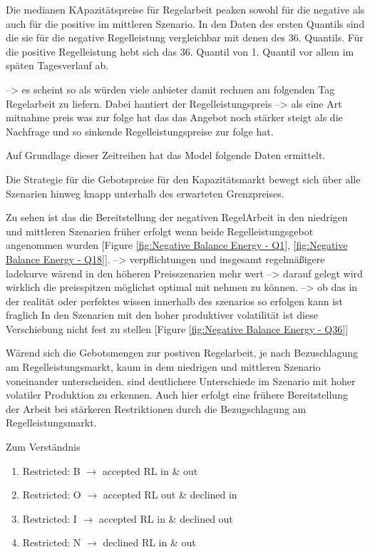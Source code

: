 Die medianen  KApazitätspreise für Regelarbeit peaken
sowohl für die negative als auch für die positive im mittleren Szenario. In den Daten des ersten Quantils sind die sie für die negative Regelleistung
vergleichbar mit denen des 36. Quantils. Für die positive Regelleistung hebt sich das 36. Quantil von 1. Quantil vor allem im späten Tagesverlauf ab.

--> es scheint so als würden viele anbieter damit rechnen am folgenden Tag Regelarbeit zu liefern. Dabei hantiert der Regelleistungspreis
--> als eine Art mitnahme preis was zur folge hat das das Angebot noch stärker steigt als die Nachfrage und so sinkende Regelleistungspreise zur folge hat.

Auf Grundlage dieser Zeitreihen hat das Model folgende Daten ermittelt.

Die Strategie für die Gebotspreise für den Kapazitätsmarkt bewegt sich über alle Szenarien hinweg knapp unterhalb des erwarteten Grenzpreises.

Zu sehen ist das die Bereitstellung der negativen RegelArbeit
in den niedrigen und mittleren Szenarien früher erfolgt wenn beide Regelleistungsgebot angenommen wurden [Figure \ref{fig:Negative Balance Energy - Q1}, \ref{fig:Negative Balance Energy - Q18}].
--> verpflichtungen und insgesamt regelmäßigere ladekurve wärend in den höheren Preisszenarien mehr wert
--> darauf gelegt wird wirklich die preisspitzen möglichst optimal mit nehmen zu können.
--> ob das in der realität oder perfektes wissen innerhalb des szenarios so erfolgen kann ist fraglich
In den Szenarien mit den hoher produktiver volatilität ist diese Verschiebung nicht fest zu stellen [Figure \ref{fig:Negative Balance Energy - Q36}]


Wärend sich die Gebotsmengen zur postiven Regelarbeit, je nach Bezuschlagung am Regelleistungsmarkt,
kaum in dem niedrigen und mittleren Szenario voneinander unterscheiden. sind deutlichere Unterschiede
im Szenario mit hoher volatiler Produktion zu erkennen. Auch hier erfolgt eine frühere Bereitstellung
der Arbeit bei stärkeren Restriktionen durch die Bezugschlagung am Regelleistungsmarkt.



Zum Verständnis
\begin{enumerate}
	\item Restricted: B $\rightarrow$ accepted RL in \& out
	\item Restricted: O $\rightarrow$ accepted RL out \& declined in
	\item Restricted: I $\rightarrow$ accepted RL in \& declined out
	\item Restricted: N $\rightarrow$ declined RL in \& out
\end{enumerate}

